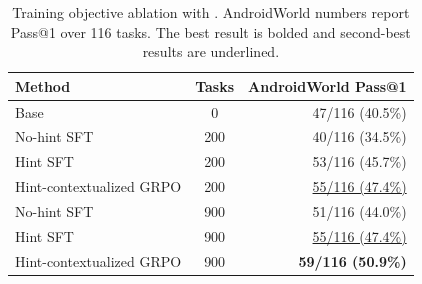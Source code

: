 \begin{table}[h]
\centering
\paperTable
\caption{Training objective ablation with . AndroidWorld numbers report Pass@1 over 116 tasks. The best result is bolded and second-best results are underlined.}
\label{tab:training_objective_ablation_main}
\begin{tabular}{@{}l c r@{}}
\toprule
\textbf{Method} & \textbf{Tasks} & \textbf{AndroidWorld Pass@1} \\
\midrule
Base & 0 & 47/116 (40.5\%) \\
No-hint SFT & 200 & 40/116 (34.5\%) \\
Hint SFT & 200 & 53/116 (45.7\%) \\
Hint-contextualized GRPO & 200 & \underline{55/116 (47.4\%)} \\
No-hint SFT & 900 & 51/116 (44.0\%) \\
Hint SFT & 900 & \underline{55/116 (47.4\%)} \\
\rowcolor{oursrowcolor}
Hint-contextualized GRPO & 900 & \textbf{59/116 (50.9\%)} \\
\bottomrule
\end{tabular}
\end{table}
